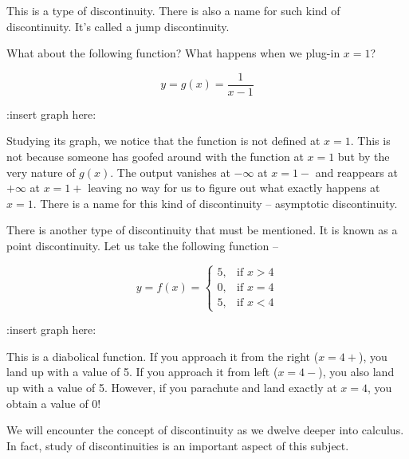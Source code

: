 This is a type of discontinuity. There is also a name for such kind of discontinuity. It's called a jump discontinuity.

What about the following function? What happens when we plug-in $x=1$?

\begin{equation}
    y = g(x) = \frac{1}{x-1}
\end{equation}

:insert graph here:

Studying its graph, we notice that the function is not defined at $x = 1$. This is not because someone has goofed around with the function at $x=1$ but by the very nature of $g(x)$. The output vanishes at $-\infty$ at $x=1-$ and reappears at $+\infty$ at $x=1+$ leaving no way for us to figure out what exactly happens at $x=1$. There is a name for this kind of discontinuity -- asymptotic discontinuity.

There is another type of discontinuity that must be mentioned. It is known as a point discontinuity. Let us take the following function --

\begin{equation}
    y = f(x)=
\begin{cases}
    5 ,& \text{if } x > 4\\
    0, & \text{if } x = 4\\
    5, & \text{if } x < 4
\end{cases}
\label{eq:complete}
\end{equation}

:insert graph here:

This is a diabolical function. If you approach it from the right ($x=4+$), you land up with a value of 5. If you approach it from left ($x=4-$), you also land up with a value of 5. However, if you parachute and land exactly at $x=4$, you obtain a value of 0!

We will encounter the concept of discontinuity as we dwelve deeper into calculus. In fact, study of discontinuities is an important aspect of this subject.
